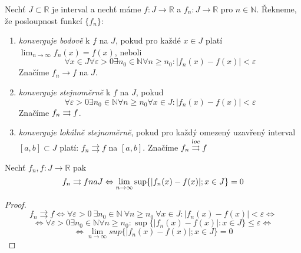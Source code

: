 \begin{definice}
Nechť $J \subset \mathbb{R}$ je interval a nechť máme $f : J \rightarrow \mathbb{R}$ a $f_n : J \rightarrow \mathbb{R}$ pro $n \in \mathbb{N}$. Řekneme, že posloupnost funkcí $\{f_n\}$:

\begin{enumerate}
\item \emph{konverguje bodově} k $f$ na $J$, pokud pro každé $x \in J$ platí $\lim_{n \rightarrow \infty} f_n(x) = f(x)$, neboli
$$\forall x \in J \forall \varepsilon > 0 \exists n_0 \in \mathbb{N} \forall n \geq n_0 : |f_n(x) - f(x)| < \varepsilon$$
Značíme $f_n \rightarrow f$ na $J$.
\item \emph{konverguje stejnoměrně} k $f$ na $J$, pokud
$$\forall \varepsilon > 0 \exists n_0 \in \mathbb{N} \forall n \geq n_0 \forall x \in J : | f_n(x) - f(x) | < \varepsilon$$
Značíme $f_n \rightrightarrows f$.
\item \emph{konverguje lokálně stejnoměrně}, pokud pro každý omezený uzavřený interval $[a, b] \subset J$ platí: $f_n \rightrightarrows f$ na $[a, b]$. Značíme $f_n \overset{loc}{\rightrightarrows} f$
\end{enumerate}
\end{definice}

\begin{vetal}
Nechť $f_n, f:J \rightarrow \mathbb{R}$ pak
$$f_n \rightrightarrows f na J \Leftrightarrow \lim_{n \rightarrow \infty} \sup \{ |f_n(x) - f(x)|; x \in J \} = 0$$
\end{vetal}
\begin{proof}
$$ f_n \rightrightarrows f \Leftrightarrow \forall \varepsilon > 0 \  \exists n_0 \in \mathbb{N} \  \forall n \geq n_0 \  \forall x \in J: |f_n(x) - f(x)| < \varepsilon \Leftrightarrow$$
$$\Leftrightarrow \forall \varepsilon > 0 \exists n_0 \in \mathbb{N} \forall n \geq n_0 : \sup \{ |f_n(x) - f(x) | : x \in J \} \leq \varepsilon \Leftrightarrow$$
$$\Leftrightarrow \lim_{n \to \infty} sup\{|f_n(x)-f(x)|;x \in J\} = 0$$
\end{proof}

